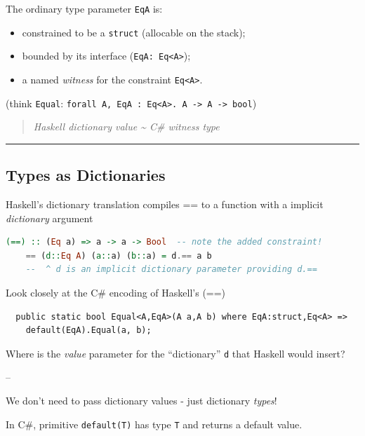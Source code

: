 The ordinary type parameter \lstinline!EqA! is:

\begin{itemize}
\tightlist
\item
  constrained to be a \lstinline!struct! (allocable on the stack);
\item
  bounded by its interface (\lstinline!EqA: Eq<A>!);
\item
  a named \emph{witness} for the constraint \lstinline!Eq<A>!.
\end{itemize}

(think \lstinline!Equal!:
\lstinline!forall A, EqA : Eq<A>. A -> A -> bool!)

\begin{quote}
\emph{Haskell dictionary value \textasciitilde{} C\# witness type}
\end{quote}

\begin{center}\rule{0.5\linewidth}{\linethickness}\end{center}

\subsection{Types as Dictionaries}\label{types-as-dictionaries}

Haskell's dictionary translation compiles == to a function with a
implicit \emph{dictionary} argument

\begin{lstlisting}[language=Haskell]
    (==) :: (Eq a) => a -> a -> Bool  -- note the added constraint!
    == (d::Eq A) (a::a) (b::a) = d.== a b  
    --  ^ d is an implicit dictionary parameter providing d.==
\end{lstlisting}

Look closely at the C\# encoding of Haskell's (==)

\begin{lstlisting}
  public static bool Equal<A,EqA>(A a,A b) where EqA:struct,Eq<A> =>
    default(EqA).Equal(a, b);
\end{lstlisting}

Where is the \emph{value} parameter for the ``dictionary'' \lstinline!d!
that Haskell would insert?

--

We don't need to pass dictionary values - just dictionary \emph{types}!

In C\#, primitive \lstinline!default(T)! has type \lstinline!T! and
returns a default value.

